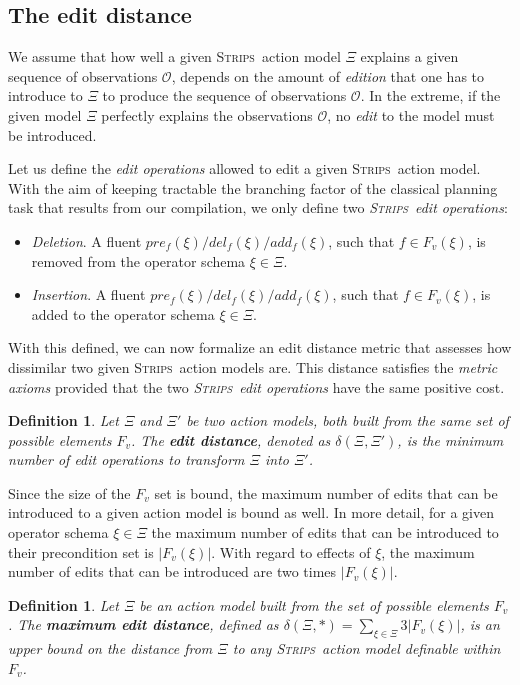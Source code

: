 \documentclass{article}
\newcommand{\strips}{\textsc{Strips}}     %
\newtheorem{definition}[theorem]{Definition}
\begin{document}
\subsection{The edit distance}
We assume that how well a given \strips\ action model $\Xi$ explains a given sequence of observations $\mathcal{O}$, depends on the amount of {\em edition} that one has to introduce to $\Xi$ to produce the sequence of observations $\mathcal{O}$. In the extreme, if the given model $\Xi$ perfectly explains the observations $\mathcal{O}$, no {\em edit} to the model must be introduced.

Let us define the \emph{edit operations} allowed to edit a given \strips\ action model. With the aim of keeping tractable the branching factor of the classical planning task that results from our compilation, we only define two {\em \strips\ edit operations}:
\begin{itemize}
\item {\em Deletion}. A fluent $pre_f(\xi)/del_f(\xi)/add_f(\xi)$, such that $f\in F_v(\xi)$, is removed from the operator schema $\xi\in\Xi$.
\item {\em Insertion}. A fluent $pre_f(\xi)/del_f(\xi)/add_f(\xi)$, such that $f\in F_v(\xi)$, is added to the operator schema $\xi\in\Xi$.
\end{itemize}

With this defined, we can now formalize an edit distance metric that assesses how dissimilar two given \strips\ action models are. This distance satisfies the {\em metric axioms} provided that the two {\em \strips\ edit operations} have the same positive cost.

\begin{definition}
Let $\Xi$ and $\Xi'$ be two action models, both built from the same set of possible elements $F_v$. The {\bf edit distance}, denoted as $\delta(\Xi,\Xi')$, is the minimum number of {\em edit operations} to transform $\Xi$ into $\Xi'$.
\end{definition}

Since the size of the $F_v$ set is bound, the maximum number of edits that can be introduced to a given action model is bound as well. In more detail, for a given operator schema $\xi\in\Xi$ the maximum number of edits that can be introduced to their precondition set is $|F_v(\xi)|$. With regard to effects of $\xi$, the maximum number of edits that can be introduced are two times $|F_v(\xi)|$.

\begin{definition}
Let $\Xi$ be an action model built from the set of possible elements $F_v$. The \textbf{maximum edit distance}, defined as $\delta(\Xi,*)=\sum_{\xi\in\Xi} 3|F_v(\xi)|$, is an upper bound on the distance from $\Xi$ to any \strips\ action model definable within $F_v$.
\end{definition}
\end{document}
